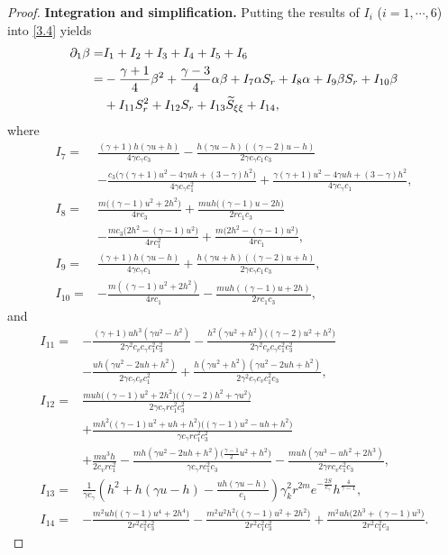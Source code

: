 \documentclass[10pt,a4paper]{amsart}
\begin{document}
\begin{proof}
\noindent\textbf{Integration and simplification.} Putting the results of $I_i$ ($i=1,\cdots,6$) into \eqref{3.4} yields
\begin{align}\label{3.5}
\partial_1\beta=&I_1+I_2+I_3+I_4+I_5+I_6 \notag \\
=& -\frac{\gamma+1}{4}\beta^{2}
+ \frac{\gamma-3}{4}\alpha\beta +I_{7}\alpha S_{r}+I_{8}\alpha +I_{9}\beta S_{r} +I_{10}\beta \notag \\
&+I_{11} S_{r}^{2} +I_{12}S_r +I_{13} \widetilde{S}_{\xi\xi} +I_{14},
\end{align}
where
\begin{align*}
I_{7}=&\frac{(\gamma+1)h(\gamma u+h)}{4\gamma c_\gamma c_3}
   - \frac{h(\gamma u-h)((\gamma-2)u-h)}{2\gamma c_\gamma c_1 c_3} \\
&- \frac{c_3\big(\gamma(\gamma+1)u^{2}-4\gamma uh+(3-\gamma)h^{2}\big)}{4\gamma c_\gamma c_1^{2}} + \frac{\gamma(\gamma+1)u^{2}-4\gamma uh+(3-\gamma)h^{2}}{4\gamma c_\gamma c_1}, \\
I_{8}=&\frac{m\big((\gamma-1)u^{2}+2h^{2}\big)}{4r c_3}
   + \frac{muh\big((\gamma-1)u-2h\big)}{2r c_1 c_3} \\
&- \frac{mc_3\big(2h^{2}-(\gamma-1)u^{2}\big)}{4r c_1^{2}}  + \frac{m\big(2h^{2}-(\gamma-1)u^{2}\big)}{4r c_1}, \\
I_{9}=&\frac{(\gamma+1)h(\gamma u-h)}{4\gamma c_\gamma c_1}
   + \frac{h(\gamma u+h)((\gamma-2)u+h)}{2\gamma c_\gamma c_1 c_3}, \\
I_{10}=&- \frac{m\left((\gamma-1)u^2 + 2h^2\right)}{4r c_1}
-\frac{muh\left((\gamma-1)u + 2h\right)}{2r c_1 c_3},
\end{align*}
and
\begin{align*}
I_{11}=&-\frac{(\gamma+1)uh^{3}(\gamma u^{2}-h^{2})}{2\gamma^{2} c_v c_\gamma c_1^{2} c_3^{2}}
   - \frac{h^{2}(\gamma u^{2}+h^{2})\big((\gamma-2)u^{2}+h^{2}\big)}{2\gamma^{2} c_v c_\gamma c_1^{2} c_3^{2}} \\
& - \frac{uh(\gamma u^{2}-2uh+h^{2})}{2\gamma c_\gamma c_v c_1^{2}}
   + \frac{h(\gamma u^{2}+h^{2})(\gamma u^{2}-2uh+h^{2})}{2\gamma^{2} c_\gamma c_v c_1^{2} c_3}, \\
I_{12}=&\frac{muh\big((\gamma-1)u^{2}+2h^{2}\big)\big((\gamma-2)h^{2}+\gamma u^{2}\big)}{2\gamma c_\gamma r c_1^{2} c_3^{2}}  \\
&+ \frac{mh^{2}\big((\gamma-1)u^{2}+uh+h^{2}\big)\big((\gamma-1)u^{2}-uh+h^{2}\big)}{\gamma c_\gamma r c_1^{2} c_3^{2}} \\
&  + \frac{mu^{3}h}{2c_v r c_1^{2}}
   - \frac{mh(\gamma u^{2}-2uh+h^{2})\big(\frac{\gamma-1}{2}u^{2}+h^{2}\big)}{\gamma c_\gamma r c_1^{2} c_3}
   - \frac{muh(\gamma u^{3}-uh^{2}+2h^{3})}{2\gamma r c_v c_1^{2} c_3}, \\
I_{13}=&\frac{1}{\gamma c_{\gamma}}
\left( h^2 + h(\gamma u - h) - \frac{uh(\gamma u-h)}{c_1} \right)\gamma_k^2 r^{2m} e^{-\frac{2S}{c_\gamma}} h^{\frac{4}{\gamma-1}}, \\
I_{14}=&-\frac{m^{2}uh\big((\gamma-1)u^{4}+2h^{4}\big)}{2r^{2} c_1^{2} c_3^{2}}
   - \frac{m^{2}u^{2}h^{2}\big((\gamma-1)u^{2}+2h^{2}\big)}{2r^{2} c_1^{2} c_3^{2}} + \frac{m^{2}uh\big(2h^{3}+(\gamma-1)u^{3}\big)}{2r^{2} c_1^{2} c_3}.
\end{align*}


\end{proof}
\end{document}
